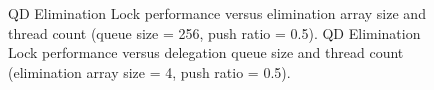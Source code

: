 \begin{figure}[]
\centering
{}
\caption[]{ QD Elimination Lock performance versus elimination array size and thread count (queue size = 256, push ratio = 0.5).  QD Elimination Lock performance versus delegation queue size and thread count (elimination array size = 4, push ratio = 0.5).}
\label{fig:qdsize_and_thrd}
\end{figure}
